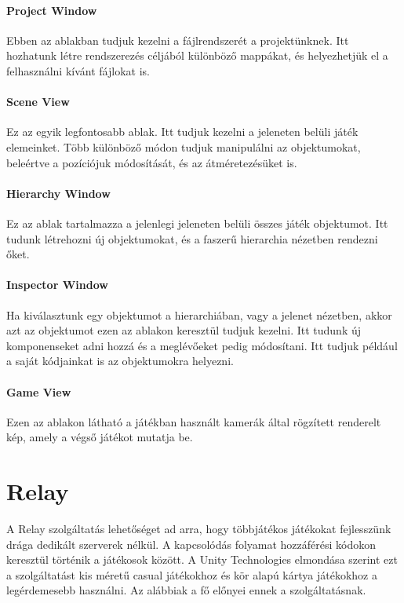 \documentclass[]{thesis-ekf}
\theoremstyle{definition}
\theoremstyle{remark}
\begin{document}
\paragraph{Project Window}
Ebben az ablakban tudjuk kezelni a fájlrendszerét a projektünknek. Itt hozhatunk létre rendszerezés céljából különböző mappákat, és helyezhetjük el a felhasználni kívánt fájlokat is. \cite{UnityProjectWindow}

\paragraph{Scene View}
Ez az egyik legfontosabb ablak. Itt tudjuk kezelni a jeleneten belüli játék elemeinket. Több különböző módon tudjuk manipulálni az objektumokat, beleértve a pozíciójuk módosítását, és az átméretezésüket is. \cite{UnitySceneView}

\paragraph{Hierarchy Window}
Ez az ablak tartalmazza a jelenlegi jeleneten belüli összes játék objektumot. Itt tudunk létrehozni új objektumokat, és a faszerű hierarchia nézetben rendezni őket. \cite{UnityHierarchyWindow}

\paragraph{Inspector Window}
Ha kiválasztunk egy objektumot a hierarchiában, vagy a jelenet nézetben, akkor azt az objektumot ezen az ablakon keresztül tudjuk kezelni. Itt tudunk új komponenseket adni hozzá és a meglévőeket pedig módosítani. Itt tudjuk például a saját kódjainkat is az objektumokra helyezni. \cite{UnityInspectorWindow}

\paragraph{Game View}
Ezen az ablakon látható a játékban használt kamerák által rögzített renderelt kép, amely a végső játékot mutatja be. \cite{UnityGameView}

\section{Relay}
\label{sec-relay}
A Relay szolgáltatás lehetőséget ad arra, hogy többjátékos játékokat fejlesszünk drága dedikált szerverek nélkül. A kapcsolódás folyamat hozzáférési kódokon keresztül történik a játékosok között. A Unity Technologies elmondása szerint ezt a szolgáltatást kis méretű casual játékokhoz és kör alapú kártya játékokhoz a legérdemesebb használni. Az alábbiak a fő előnyei ennek a szolgáltatásnak. \cite{UnityRelayService} \cite{UnityRelayDocs}
\end{document}
